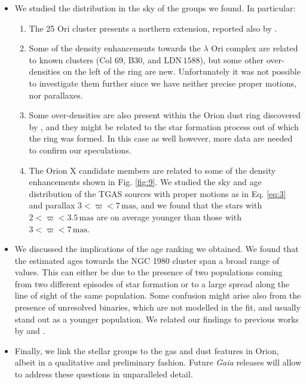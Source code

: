 \documentclass[twocolumn]{aa}
\begin{document}
\begin{itemize}
\item We studied the distribution in the sky of the groups we found. In particular:
\begin{enumerate}
\item The 25 Ori cluster presents a northern extension, reported also by \cite{Lombardi2017}.
\item Some of the density enhancements towards the $\lambda$ Ori complex are related to known clusters (Col 69, B30, and $\mathrm{LDN \, 1588}$), but some other over-densities on the left of the ring are new. Unfortunately it was not possible to investigate them further since we  have neither precise proper motions, nor parallaxes.
\item Some over-densities are also present within the Orion dust ring discovered by \cite{Schlafly2015}, and they might be related to the star formation process out of which the ring was formed. In this case as well however, more data are needed to confirm our speculations.
\item The Orion X candidate members \citep{Bouy2015} are related to some of the density enhancements shown in Fig. \ref{fig:9}. We studied the sky and age distribution of the TGAS sources with proper motions as in Eq. \eqref{eq:3} and parallax $3 < \varpi < 7 \, \mathrm{mas}$, and we found that the stars with $2 < \varpi < 3.5 \, \mathrm{mas}$ are on average younger than those with $3 < \varpi < 7 \, \mathrm{mas}$.
\end{enumerate}

\item We discussed the implications of the age ranking we obtained. 
We found that the estimated ages towards the NGC 1980 cluster span a broad range of values. This can either be due to the presence of two populations coming from two different episodes of star formation or to a large spread along the line of sight of the same population. Some confusion might arise also from the presence of unresolved binaries, which are not modelled in the fit, and usually stand out as a younger population. We related our findings to previous works by \cite{Bouy2014, DaRio2016} and \cite{Fang2017}. 
\item  Finally, we link the stellar groups to the gas and dust features in Orion, albeit in a qualitative and preliminary fashion. Future \textit{Gaia} releases will allow to address these questions in unparalleled detail.
\end{itemize}
\end{document}

